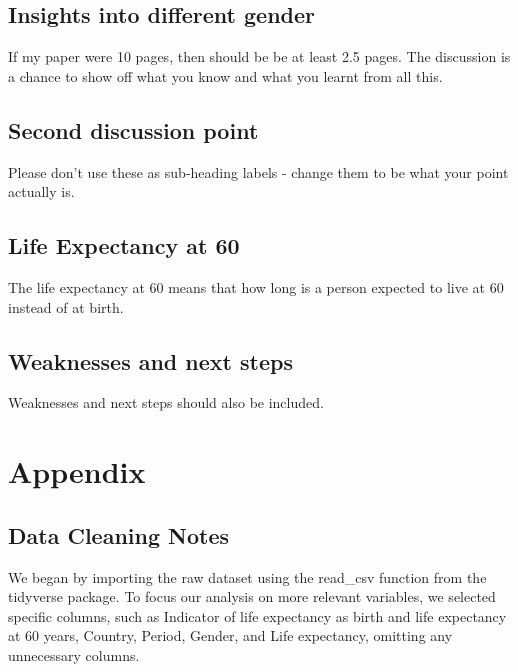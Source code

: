 \documentclass[
  letterpaper,
  DIV=11,
  numbers=noendperiod]{scrartcl}
\begin{document}
\subsection{Insights into different
gender}\label{insights-into-different-gender}

If my paper were 10 pages, then should be be at least 2.5 pages. The
discussion is a chance to show off what you know and what you learnt
from all this.

\subsection{Second discussion point}\label{second-discussion-point}

Please don't use these as sub-heading labels - change them to be what
your point actually is.

\subsection{Life Expectancy at 60}\label{life-expectancy-at-60}

The life expectancy at 60 means that how long is a person expected to
live at 60 instead of at birth.

\subsection{Weaknesses and next steps}\label{weaknesses-and-next-steps}

Weaknesses and next steps should also be included.

\newpage

\appendix

\section{Appendix}\label{sec-appendix}

\subsection{Data Cleaning Notes}\label{data-cleaning-notes}

We began by importing the raw dataset using the read\_csv function from
the tidyverse package. To focus our analysis on more relevant variables,
we selected specific columns, such as Indicator of life expectancy as
birth and life expectancy at 60 years, Country, Period, Gender, and Life
expectancy, omitting any unnecessary columns.
\end{document}
